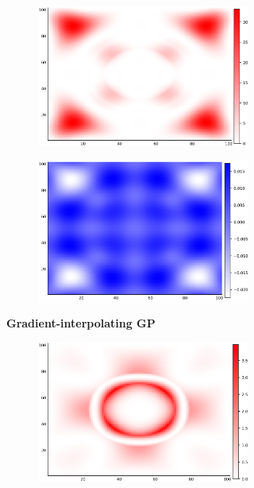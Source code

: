 \documentclass{article}
\numberwithin{equation}{section}
\begin{document}
\begin{figure}
\begin{subfigure}[b]{.5\textwidth}
\begin{subfigure}[b]{.5\textwidth}
        \includegraphics[scale=0.27]{figures/heatmaps/error-der-25.png}
      \end{subfigure}%
      \begin{subfigure}[b]{.5\textwidth}
        \centering
        \includegraphics[scale=0.27]{figures/heatmaps/variance-der-25.png}
      \end{subfigure}
      \caption{\textbf{Gradient-interpolating GP}}
    \end{subfigure}
    \begin{subfigure}[b]{.5\textwidth}
      \centering
      \begin{subfigure}[b]{.5\textwidth}
        \centering
        \includegraphics[scale=0.27]{figures/heatmaps/error-noisy-25.png}

\end{subfigure}
\end{subfigure}
\end{figure}
\end{document}
